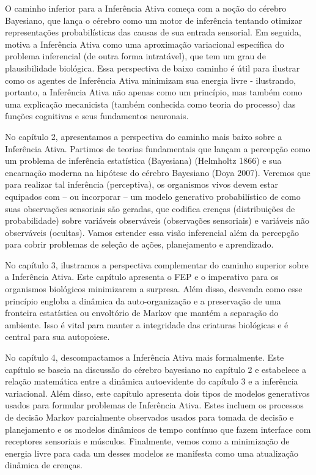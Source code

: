 \documentclass[
  12pt,
]{book}
\begin{document}
O caminho inferior para a Inferência Ativa começa com a noção do cérebro Bayesiano, que lança o cérebro como um motor de inferência tentando otimizar representações probabilísticas das causas de sua entrada sensorial. Em seguida, motiva a Inferência Ativa como uma aproximação variacional específica do problema inferencial (de outra forma intratável), que tem um grau de plausibilidade biológica. Essa perspectiva de baixo caminho é útil para ilustrar como os agentes de Inferência Ativa minimizam sua energia livre - ilustrando, portanto, a Inferência Ativa não apenas como um princípio, mas também como uma explicação mecanicista (também conhecida como teoria do processo) das funções cognitivas e seus fundamentos neuronais.

No capítulo 2, apresentamos a perspectiva do caminho mais baixo sobre a Inferência Ativa. Partimos de teorias fundamentais que lançam a percepção como um problema de inferência estatística (Bayesiana) (Helmholtz 1866) e sua encarnação moderna na hipótese do cérebro Bayesiano (Doya 2007). Veremos que para realizar tal inferência (perceptiva), os organismos vivos devem estar equipados com -- ou incorporar -- um modelo generativo probabilístico de como suas observações sensoriais são geradas, que codifica crenças (distribuições de probabilidade) sobre variáveis observáveis (observações sensoriais) e variáveis não observáveis (ocultas). Vamos estender essa visão inferencial além da percepção para cobrir problemas de seleção de ações, planejamento e aprendizado.

No capítulo 3, ilustramos a perspectiva complementar do caminho superior sobre a Inferência Ativa. Este capítulo apresenta o FEP e o imperativo para os organismos biológicos minimizarem a surpresa. Além disso, desvenda como esse princípio engloba a dinâmica da auto-organização e a preservação de uma fronteira estatística ou envoltório de Markov que mantém a separação do ambiente. Isso é vital para manter a integridade das criaturas biológicas e é central para sua autopoiese.

No capítulo 4, descompactamos a Inferência Ativa mais formalmente. Este capítulo se baseia na discussão do cérebro bayesiano no capítulo 2 e estabelece a relação matemática entre a dinâmica autoevidente do capítulo 3 e a inferência variacional. Além disso, este capítulo apresenta dois tipos de modelos generativos usados para formular problemas de Inferência Ativa. Estes incluem os processos de decisão Markov parcialmente observados usados para tomada de decisão e planejamento e os modelos dinâmicos de tempo contínuo que fazem interface com receptores sensoriais e músculos. Finalmente, vemos como a minimização de energia livre para cada um desses modelos se manifesta como uma atualização dinâmica de crenças.
\end{document}
